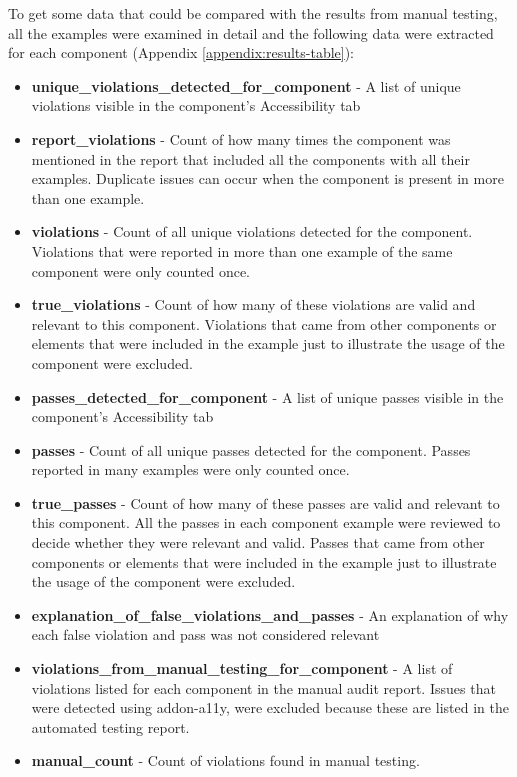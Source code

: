 \documentclass{master_thesis}
\begin{document}
To get some data that could be compared with the results from manual testing, all the examples were examined in detail and the following data were extracted for each component (Appendix \ref{appendix:results-table}):
\begin{itemize}
	\item \textbf{unique\_violations\_detected\_for\_component} - A list of unique violations visible in the component's Accessibility tab
	\item \textbf{report\_violations} - Count of how many times the component was mentioned in the report that included all the components with all their examples. Duplicate issues can occur when the component is present in more than one example.
	\item \textbf{violations} - Count of all unique violations detected for the component. Violations that were reported in more than one example of the same component were only counted once.
	\item \textbf{true\_violations} - Count of how many of these violations are valid and relevant to this component. Violations that came from other components or elements that were included in the example just to illustrate the usage of the component were excluded.
	\item \textbf{passes\_detected\_for\_component} - A list of unique passes visible in the component's Accessibility tab
	\item \textbf{passes} - Count of all unique passes detected for the component. Passes reported in many examples were only counted once.
	\item \textbf{true\_passes} - Count of how many of these passes are valid and relevant to this component. All the passes in each component example were reviewed to decide whether they were relevant and valid. Passes that came from other components or elements that were included in the example just to illustrate the usage of the component were excluded.
	\item \textbf{explanation\_of\_false\_violations\_and\_passes} - An explanation of why each false violation and pass was not considered relevant
	\item \textbf{violations\_from\_manual\_testing\_for\_component} - A list of violations listed for each component in the manual audit report. Issues that were detected using addon-a11y, were excluded because these are listed in the automated testing report.
	\item \textbf{manual\_count} - Count of violations found in manual testing.
\end{itemize}
\end{document}
